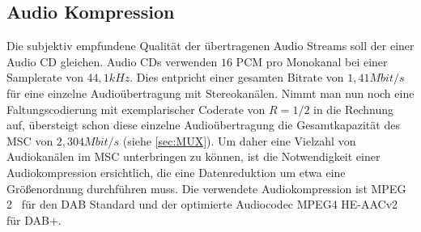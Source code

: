 \subsection{Audio Kompression}
Die subjektiv empfundene Qualität der übertragenen Audio Streams soll der einer Audio CD gleichen. Audio CDs verwenden $16$ PCM pro Monokanal bei einer Samplerate von $44,1 kHz$. Dies entpricht einer gesamten Bitrate von $1,41 Mbit/s$ für eine einzelne Audioübertragung mit Stereokanälen. Nimmt man nun noch eine Faltungscodierung mit exemplarischer Coderate von $R=1/2$ in die Rechnung auf, übersteigt schon diese einzelne Audioübertragung die Gesamtkapazität des \ac{MSC} von $2,304 Mbit/s$ (siehe \ref{sec:MUX}). Um daher eine Vielzahl von Audiokanälen im \ac{MSC} unterbringen zu können, ist die Notwendigkeit einer Audiokompression ersichtlich, die eine Datenreduktion um etwa eine Größenordnung durchführen muss. Die verwendete Audiokompression ist \ac{MPEG 2}~\cite{etsi:mp2} für den DAB Standard und der optimierte Audiocodec MPEG4 HE-AACv2 für DAB+.

